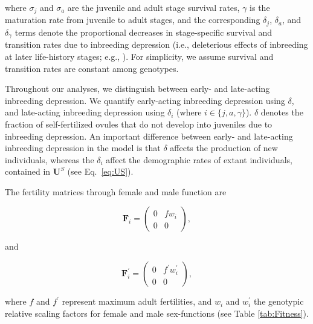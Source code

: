 \documentclass[11pt]{article}
\def\mbf#1{\mathbf{#1}}
\begin{document}
\noindent where $\sigma_j$ and $\sigma_a$ are the juvenile and adult stage survival rates, $\gamma$ is the maturation rate from juvenile to adult stages, and the corresponding $\delta_j$, $\delta_a$, and $\delta_{\gamma}$ terms denote the proportional decreases in stage-specific survival and transition rates due to inbreeding depression (i.e., deleterious effects of inbreeding at later life-history stages; e.g., \citealt{HarderRoutely2006}). For simplicity, we assume survival and transition rates are constant among genotypes. 

Throughout our analyses, we distinguish between early- and late-acting inbreeding depression. We quantify early-acting inbreeding depression using $\delta$, and late-acting inbreeding depression using $\delta_i$ (where $i \in \{j,a,\gamma\}$). $\delta$ denotes the fraction of self-fertilized ovules that do not develop into juveniles due to inbreeding depression. An important difference between early- and late-acting inbreeding depression in the model is that $\delta$ affects the production of new individuals, whereas the $\delta_i$ affect the demographic rates of extant individuals, contained in $\mbf{U}^S$ (see Eq.~\ref{eq:US}).

The fertility matrices through female and male function are
\begin{linenomath*}
\begin{equation}\label{eq:F_female}
	\mbf{F}_{i} = \left(
					\begin{array}{cc}
						0 & f w_{i} \\
						0 & 0
					\end{array}
				\right),
\end{equation}
\end{linenomath*}
\noindent and
\begin{linenomath*}
\begin{equation}\label{eq:F_male}
	\mbf{F}^{\prime}_{i} = \left(
					\begin{array}{cc}
						0 & f^{\prime} w^{\prime}_{i} \\
						0 & 0
					\end{array}
				\right),
\end{equation}
\end{linenomath*}

\noindent where $f$ and $f^{\prime}$ represent maximum adult fertilities, and $w_{i}$ and $w^{\prime}_{i}$ the genotypic relative scaling factors for female and male sex-functions (see Table \ref{tab:Fitness}). 
\end{document}
